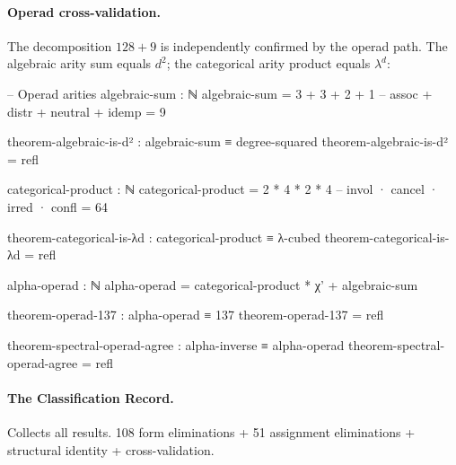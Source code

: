 \documentclass[11pt,a4paper]{article}
\begin{document}
\paragraph{Operad cross-validation.}
The decomposition $128 + 9$ is independently confirmed by the operad path.
The algebraic arity sum equals $d^2$; the categorical arity product
equals $\lambda^d$:

\begin{code}
-- Operad arities
algebraic-sum : ℕ
algebraic-sum = 3 + 3 + 2 + 1              -- assoc + distr + neutral + idemp = 9

theorem-algebraic-is-d² : algebraic-sum ≡ degree-squared
theorem-algebraic-is-d² = refl

categorical-product : ℕ
categorical-product = 2 * 4 * 2 * 4        -- invol · cancel · irred · confl = 64

theorem-categorical-is-λd : categorical-product ≡ λ-cubed
theorem-categorical-is-λd = refl

alpha-operad : ℕ
alpha-operad = categorical-product * χ' + algebraic-sum

theorem-operad-137 : alpha-operad ≡ 137
theorem-operad-137 = refl

theorem-spectral-operad-agree : alpha-inverse ≡ alpha-operad
theorem-spectral-operad-agree = refl
\end{code}


\paragraph{The Classification Record.}
Collects all results. 108 form eliminations + 51 assignment eliminations
+ structural identity + cross-validation.
\end{document}
